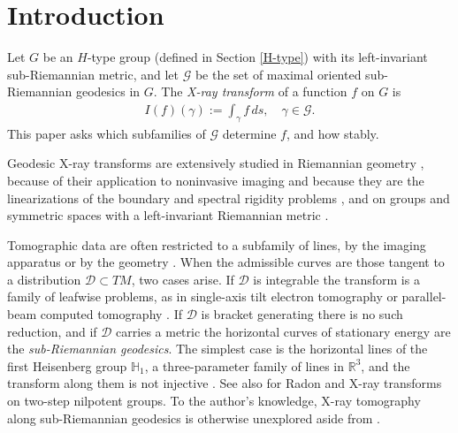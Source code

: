\documentclass[11pt]{amsart}
\theoremstyle{plain}
\theoremstyle{definition}
\theoremstyle{remark}
\numberwithin{equation}{section}
\def\cG{\mathcal{G}}
\def\cD{\mathcal{D}}
\def\R{{\mathbb R}}%
\def \heis {\mathbb{H}}
\numberwithin{equation}{section}
\begin{document}
\makeatletter
\renewcommand\l@subsection{\@tocline{2}{0pt}{3pc}{5pc}{}}
\makeatother


\tableofcontents


\section{Introduction}

Let $G$ be an $H$-type group (defined in Section \ref{H-type}) with its left-invariant sub-Riemannian metric, and let $\cG$ be the set of maximal oriented sub-Riemannian geodesics in $G$. The \textit{X-ray transform} of a function $f$ on $G$ is
\begin{align*}
	I(f)(\gamma):=\int_\gamma f\, ds, \quad \gamma\in \cG.
\end{align*}
This paper asks which subfamilies of $\cG$ determine $f$, and how stably. 

Geodesic X-ray transforms are extensively studied in Riemannian geometry \cite{sharafutdinovIntegralGeometryTensor1994, ilmavirtaIntegralGeometryManifolds2018, paternainGeometricInverseProblems2023}, because of their application to noninvasive imaging \cite{nattererMathematicsComputerizedTomography1986} and because they are the linearizations of the boundary and spectral rigidity problems \cite{stefanovRigidityMetricsSame1998, guilleminInverseSpectralResults1980}, and on groups and symmetric spaces with a left-invariant Riemannian metric \cite{helgasonIntegralGeometryRadon2011, ilmavirtaRadonTransformsCompact2016, ilmavirtaTorusComputedTomography2020a, kleinFunkTransformCompact2009}.

Tomographic data are often restricted to a subfamily of lines, by the imaging apparatus or by the geometry \cite{gelfandDifferentialFormsIntegral1969, greenleafNonlocalInversionFormulas1989}. When the admissible curves are those tangent to a distribution $\cD\subset TM$, two cases arise. If $\cD$ is integrable the transform is a family of leafwise problems, as in single-axis tilt electron tomography \cite{quintoLocalTomographyElectron2008} or parallel-beam computed tomography \cite{nattererMathematicsComputerizedTomography1986}. If $\cD$ is bracket generating there is no such reduction, and if $\cD$ carries a metric the horizontal curves of stationary energy are the \textit{sub-Riemannian geodesics}. The simplest case is the horizontal lines of the first Heisenberg group $\heis_1$, a three-parameter family of lines in $\R^3$, and the transform along them is not injective \cite{strichartzLpHarmonicAnalysis1991}. See also \cite{rubinRadonTransformHeisenberg2012, peyerimhoffXrayTransform2step2016} for Radon and X-ray transforms on two-step nilpotent groups. To the author's knowledge, X-ray tomography along sub-Riemannian geodesics is otherwise unexplored aside from \cite{flynnInjectivityHeisenbergXray2021, flynnSingularValueDecomposition2023}.
\end{document}
